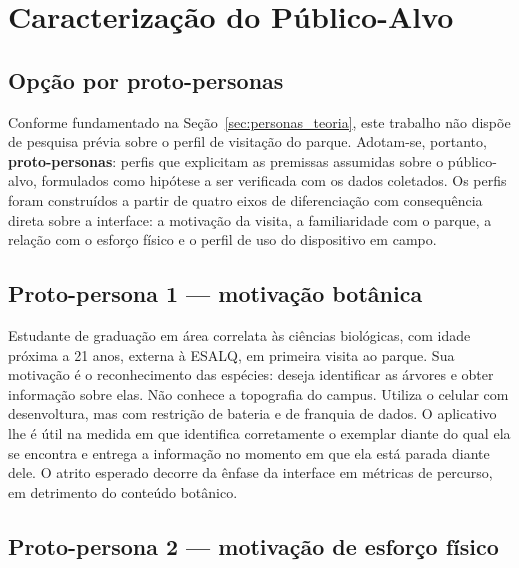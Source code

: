 \section{Caracterização do Público-Alvo}
\label{sec:personas}

\subsection{Opção por proto-personas}

Conforme fundamentado na Seção~\ref{sec:personas_teoria}, este trabalho não dispõe
de pesquisa prévia sobre o perfil de visitação do parque. Adotam-se, portanto,
\textbf{proto-personas}: perfis que explicitam as premissas assumidas sobre o
público-alvo, formulados como hipótese a ser verificada com os dados coletados.
Os perfis foram construídos a partir de quatro eixos de diferenciação com
consequência direta sobre a interface: a motivação da visita, a familiaridade com
o parque, a relação com o esforço físico e o perfil de uso do dispositivo em
campo.


\subsection{Proto-persona 1 --- motivação botânica}

Estudante de graduação em área correlata às ciências biológicas, com idade
próxima a 21 anos, externa à ESALQ, em primeira visita ao parque. Sua motivação é
o reconhecimento das espécies: deseja identificar as árvores e obter informação
sobre elas. Não conhece a topografia do campus. Utiliza o celular com desenvoltura,
mas com restrição de bateria e de franquia de dados. O aplicativo lhe é útil na
medida em que identifica corretamente o exemplar diante do qual ela se encontra e
entrega a informação no momento em que ela está parada diante dele. O atrito
esperado decorre da ênfase da interface em métricas de percurso, em detrimento do
conteúdo botânico.

\subsection{Proto-persona 2 --- motivação de esforço físico}

